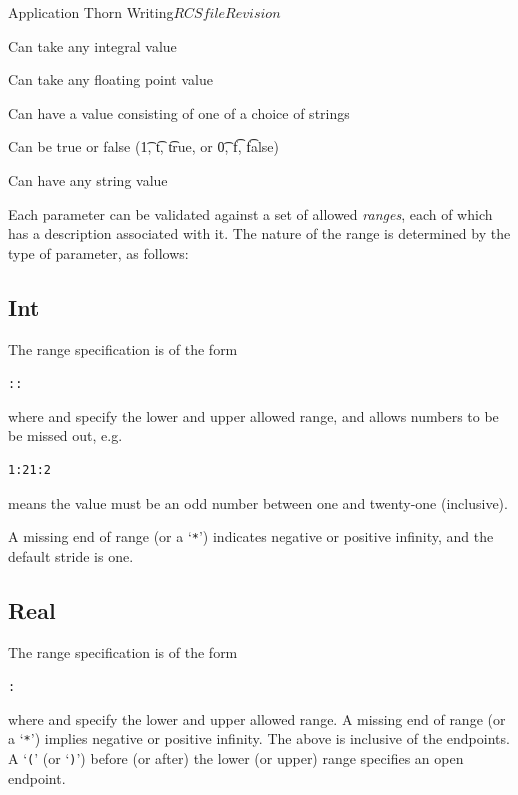 \begin{cactuspart}{Application Thorn Writing}{$RCSfile$}{$Revision$}
\begin{Lentry}
\item[Int]  Can take any integral value
\item[Real] Can take any floating point value
\item[Keyword] Can have a value consisting of one of a choice of strings
\item[Boolean] Can be true or false ({\t 1}, {\t t}, {\t true}, or
{\t 0}, {\t f}, {\t false})
\item[String] Can have any string value
\end{Lentry}

Each parameter can be validated against a set of allowed
\textit{ranges}, each of which has a description associated with it.
The nature
of the range is determined by the type of parameter, as follows:

\subsection{Int}

The range specification is of the form

\begin{alltt}
::
\end{alltt}

where  and  specify the lower and upper allowed
range, and  allows numbers to be be missed out, e.g.\
\begin{verbatim}
1:21:2
\end{verbatim}
means the value must be an odd number between one and twenty-one
(inclusive).

A missing end of range (or a `\texttt{*}') indicates negative or positive
infinity, and the default stride is one.

\subsection{Real}

The range specification is of the form
\begin{alltt}
:
\end{alltt}
where  and  specify the lower and upper allowed
range.  A missing end of range (or a `\texttt{*}') implies negative or positive
infinity.  The above is inclusive of the endpoints.  A `\texttt{(}'
(or `\texttt{)}') before (or after) the lower (or upper) range specifies an open
endpoint.


\end{cactuspart}
